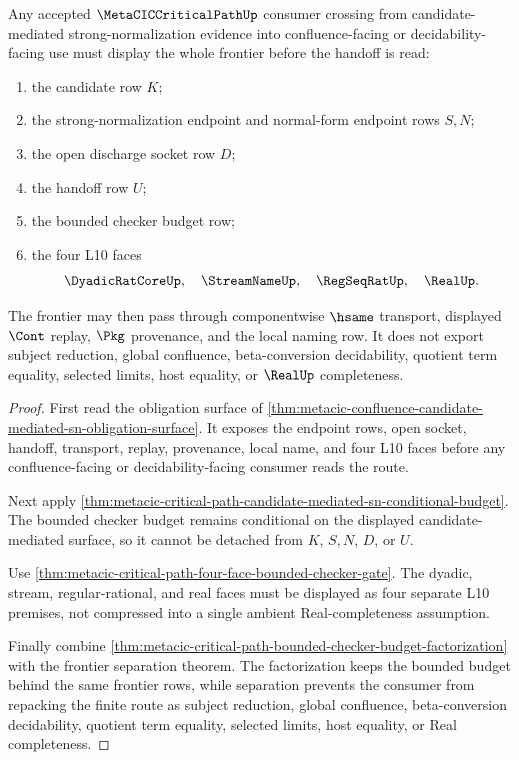 \begin{theorem}
\label{thm:metaciccriticalpath-candidate-mediated-sn-frontier-coverage}
Any accepted $\MetaCICCriticalPathUp$ consumer crossing from candidate-mediated strong-normalization evidence into confluence-facing or decidability-facing use must display the whole frontier before the handoff is read:
\begin{enumerate}
\item the candidate row $K$;
\item the strong-normalization endpoint and normal-form endpoint rows $S,N$;
\item the open discharge socket row $D$;
\item the handoff row $U$;
\item the bounded checker budget row;
\item the four L10 faces
$$
\DyadicRatCoreUp,\quad \StreamNameUp,\quad \RegSeqRatUp,\quad \RealUp .
$$
\end{enumerate}
The frontier may then pass through componentwise $\hsame$ transport, displayed $\Cont$ replay, $\Pkg$ provenance, and the local naming row. It does not export subject reduction, global confluence, beta-conversion decidability, quotient term equality, selected limits, host equality, or $\RealUp$ completeness.
\end{theorem}
\begin{proof}
First read the obligation surface of \autoref{thm:metacic-confluence-candidate-mediated-sn-obligation-surface}. It exposes the endpoint rows, open socket, handoff, transport, replay, provenance, local name, and four L10 faces before any confluence-facing or decidability-facing consumer reads the route.

Next apply \autoref{thm:metacic-critical-path-candidate-mediated-sn-conditional-budget}. The bounded checker budget remains conditional on the displayed candidate-mediated surface, so it cannot be detached from $K$, $S,N$, $D$, or $U$.

Use \autoref{thm:metacic-critical-path-four-face-bounded-checker-gate}. The dyadic, stream, regular-rational, and real faces must be displayed as four separate L10 premises, not compressed into a single ambient Real-completeness assumption.

Finally combine \autoref{thm:metacic-critical-path-bounded-checker-budget-factorization} with the frontier separation theorem. The factorization keeps the bounded budget behind the same frontier rows, while separation prevents the consumer from repacking the finite route as subject reduction, global confluence, beta-conversion decidability, quotient term equality, selected limits, host equality, or Real completeness.
\end{proof}


